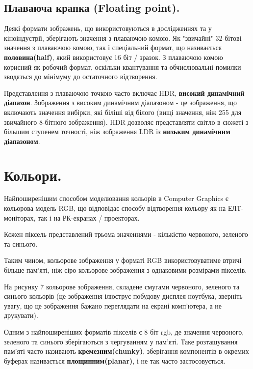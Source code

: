\documentclass[11pt]{article}
\begin{document}
    \subsection{Плаваюча крапка (Floating point).}\label{subsec:floating_point}
    Деякі формати зображень, що використовуються в дослідженнях та у кіноіндустрії, зберігають значення з плаваючою комою.
    Як "звичайні" 32-бітові значення з плаваючою комою, так і спеціальний формат, що називається \textbf{половина(half)}, який використовує 16 біт / зразок.
    З плаваючою комою корисний як робочий формат, оскільки квантування та обчислювальні помилки зводяться до мінімуму до остаточного відтворення.

    Представлення з плаваючою точкою часто включає HDR, \textbf{високий динамічний діапазон}.
    Зображення з високим динамічним діапазоном - це зображення, що включають значення вибірки, які біліші від білого (вищі значення, ніж 255 для звичайного 8-бітного зображення).
    HDR дозволяє представляти світло в сюжеті з більшим ступенем точності, ніж зображення LDR із \textbf{низьким динамічним діапазоном}.

    \section{Кольори.}\label{sec:color}
    Найпоширенішим способом моделювання кольорів в Computer Graphics є кольорова модель RGB, що відповідає способу відтворення кольору як на ЕЛТ-моніторах, так і на РК-екранах / проекторах.

    Кожен піксель представлений трьома значеннями - кількістю червоного, зеленого та синього.

    Таким чином, кольорове зображення у форматі RGB використовуватиме втричі більше пам'яті, ніж сіро-кольорове зображення з однаковими розмірами пікселів.

    На рисунку 7 кольорове зображення, складене смугами червоного, зеленого та синього кольорів (це зображення ілюструє побудову дисплея ноутбука, зверніть увагу, що це зображення бажано переглядати на екрані комп'ютера, а не друкувати).

    Одним з найпоширеніших форматів пікселів є 8 біт rgb, де значення червоного, зеленого та синього зберігаються з чергуванням у пам'яті.
    Таке розташування пам'яті часто називають \textbf{кремезним(chunky)}, зберігання компонентів в окремих буферах називається \textbf{площинним(planar)}, і не так часто застосовується.
\end{document}
